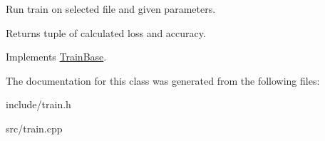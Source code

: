 Run train on selected file and given parameters. \begin{DoxyReturn}{Returns}
tuple of calculated loss and accuracy. 
\end{DoxyReturn}


Implements \hyperlink{classTrainBase}{Train\+Base}.



The documentation for this class was generated from the following files\+:\begin{DoxyCompactItemize}
\item 
include/train.\+h\item 
src/train.\+cpp\end{DoxyCompactItemize}
